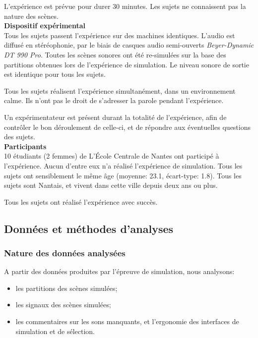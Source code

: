 L'expérience est prévue pour durer 30 minutes. Les sujets ne connaissent pas la nature des scènes.\\

{\setlength{\parindent}{0cm}\textbf{Dispositif expérimental}} \\

Tous les sujets passent l'expérience sur des machines identiques. L'audio est diffusé en stéréophonie, par le biais de casques audio semi-ouverts \emph{Beyer-Dynamic DT 990 Pro}. Toutes les scènes sonores ont été re-simulées sur la base des partitions obtenues lors de l'expérience de simulation. Le niveau sonore de sortie est identique pour tous les sujets.

Tous les sujets réalisent l'expérience simultanément, dans un environnement calme. Ils n'ont pas le droit de s'adresser la parole pendant l'expérience. 

Un expérimentateur est présent durant la totalité de l'expérience, afin de contrôler le bon déroulement de celle-ci, et de répondre aux éventuelles questions des sujets.  \\

{\setlength{\parindent}{0cm}\textbf{Participants}} \\

10 étudiants (2 femmes) de L’École Centrale de Nantes ont participé à l'expérience. Aucun d'entre eux n'a réalisé l'expérience de simulation. Tous les sujets ont sensiblement le même âge (moyenne: 23.1, écart-type: 1.8). Tous les sujets sont Nantais, et vivent dans cette ville depuis deux ans ou plus.

Tous les sujets ont réalisé l'expérience avec succès.

\subsection{Données et méthodes d'analyses}

\subsubsection{Nature des données analysées}
\label{sec:ch5_dataType1}

A partir des données produites par l'épreuve de simulation, nous analysons:

\begin{itemize}
\item les partitions des scènes simulées;
\item les signaux des scènes simulées;
\item les commentaires sur les sons manquants, et l'ergonomie des interfaces de simulation et de sélection.
\end{itemize}

